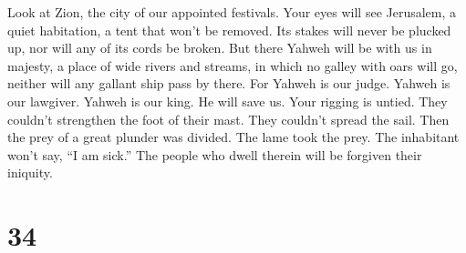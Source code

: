  Look at Zion, the city of our appointed festivals. Your
eyes will see Jerusalem, a quiet habitation, a tent that won't be
removed. Its stakes will never be plucked up, nor will any of its cords
be broken.  But there Yahweh will be with us in majesty, a
place of wide rivers and streams, in which no galley with oars will go,
neither will any gallant ship pass by there.  For Yahweh is
our judge. Yahweh is our lawgiver. Yahweh is our king. He will save us.
 Your rigging is untied. They couldn't strengthen the foot
of their mast. They couldn't spread the sail. Then the prey of a great
plunder was divided. The lame took the prey.  The
inhabitant won't say, ``I am sick.'' The people who dwell therein will
be forgiven their iniquity.

\hypertarget{section-33}{%
\section{34}\label{section-33}}

